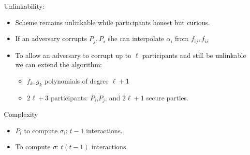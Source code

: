 \begin{frame}
Unlinkability:
\begin{itemize}
\item Scheme remains unlinkable while participants honest but curious.
\item If an adversary corrupts $P_j, P_s$ she can interpolate $\alpha_i$ from $f_{ij},f_{is}$
\item To allow an adversary to corrupt up to $\ell$ participants and still be unlinkable we can extend the algorithm:
\begin{itemize}
\item $f_k,g_k$ polynomials of degree $\ell+1$
\item $2 \ell + 3$ participants: $P_i$,$P_j$, and $2\ell+1$ secure parties.
\end{itemize}
\end{itemize}
\end{frame}

\begin{frame}
Complexity
\begin{itemize}
\item $P_i$ to compute $\sigma_i$: $t-1$ interactions.
\item To compute $\sigma$: $t(t-1)$ interactions.
\end{itemize}
\end{frame}